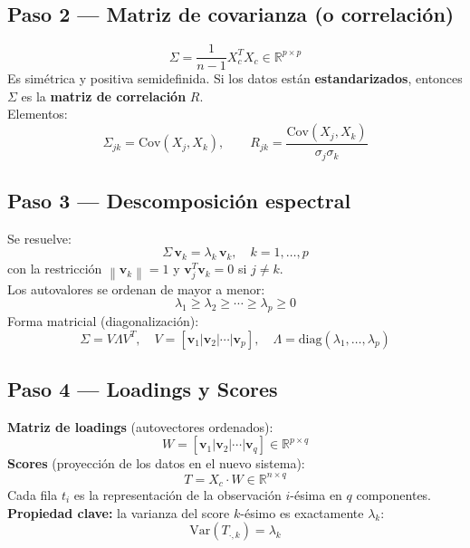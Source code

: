 \documentclass[11pt,a4paper]{article}
\newcommand{\R}{\mathbb{R}}
\newcommand{\norm}[1]{\left\lVert#1\right\rVert}
\begin{document}
\subsection{Paso 2 — Matriz de covarianza (o correlación)}

\begin{formulabox}
\[
\boxed{\;\Sigma = \frac{1}{n-1} X_c^{T} X_c \in \R^{p\times p}\;}
\]
Es simétrica y positiva semidefinida. Si los datos están \textbf{estandarizados}, entonces $\Sigma$ es la \textbf{matriz de correlación} $R$.\\

Elementos:
\[
\Sigma_{jk} = \mathrm{Cov}(X_j, X_k), \qquad R_{jk} = \frac{\mathrm{Cov}(X_j, X_k)}{\sigma_j \sigma_k}
\]
\end{formulabox}

\subsection{Paso 3 — Descomposición espectral}

\begin{formulabox}
Se resuelve:
\[
\boxed{\;\Sigma\,\mathbf{v}_k = \lambda_k\,\mathbf{v}_k, \quad k=1,\ldots,p\;}
\]
con la restricción $\norm{\mathbf{v}_k} = 1$ y $\mathbf{v}_j^{T}\mathbf{v}_k = 0$ si $j\neq k$.\\
Los autovalores se ordenan de mayor a menor:
\[
\lambda_1 \geq \lambda_2 \geq \cdots \geq \lambda_p \geq 0
\]
Forma matricial (diagonalización):
\[
\Sigma = V\Lambda V^{T}, \quad V = [\mathbf{v}_1 | \mathbf{v}_2 | \cdots | \mathbf{v}_p], \quad \Lambda = \mathrm{diag}(\lambda_1,\ldots,\lambda_p)
\]
\end{formulabox}

\subsection{Paso 4 — Loadings y Scores}

\begin{formulabox}
\textbf{Matriz de loadings} (autovectores ordenados):
\[
W = [\mathbf{v}_1 | \mathbf{v}_2 | \cdots | \mathbf{v}_q] \in \R^{p\times q}
\]
\textbf{Scores} (proyección de los datos en el nuevo sistema):
\[
\boxed{\;T = X_c \cdot W \in \R^{n\times q}\;}
\]
Cada fila $t_i$ es la representación de la observación $i$-ésima en $q$ componentes.\\

\textbf{Propiedad clave:} la varianza del score $k$-ésimo es exactamente $\lambda_k$:
\[
\mathrm{Var}(T_{\cdot,k}) = \lambda_k
\]
\end{formulabox}
\end{document}
